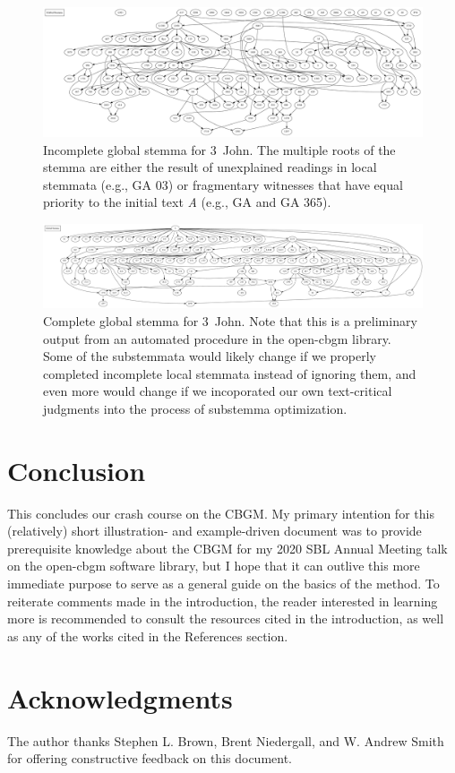 \documentclass[a4paper, 12pt]{article}
\begin{document}
	\begin{figure}
		\centering
		\includegraphics[width=\textwidth]{../graphics/global-stemma-incomplete.pdf}
		\caption{Incomplete global stemma for 3~John. The multiple roots of the stemma are either the result of unexplained readings in local stemmata (e.g., GA 03) or fragmentary witnesses that have equal priority to the initial text \emph{A} (e.g., GA  and GA 365).}
		\label{fig:global-stemma-incomplete}
	\end{figure}
	
	\begin{figure}
		\centering
		\includegraphics[width=\textwidth]{../graphics/global-stemma.pdf}
		\caption{Complete global stemma for 3~John. Note that this is a preliminary output from an automated procedure in the \textsf{open-cbgm} library. Some of the substemmata would likely change if we properly completed incomplete local stemmata instead of ignoring them, and even more would change if we incoporated our own text-critical judgments into the process of substemma optimization.}
		\label{fig:global-stemma}
	\end{figure}
	
	\newpage
	
	\section*{Conclusion}\label{sec:conclusion}
	This concludes our crash course on the CBGM. My primary intention for this (relatively) short illustration- and example-driven document was to provide prerequisite knowledge about the CBGM for my 2020 SBL Annual Meeting talk on the \textsf{open-cbgm} software library, but I hope that it can outlive this more immediate purpose to serve as a general guide on the basics of the method. To reiterate comments made in the introduction, the reader interested in learning more is recommended to consult the resources cited in the introduction, as well as any of the works cited in the References section.
	
	\section*{Acknowledgments}\label{sec:acknowledgments}
	The author thanks Stephen L. Brown, Brent Niedergall, and W. Andrew Smith for offering constructive feedback on this document.
	
	\printbibliography
\end{document}
